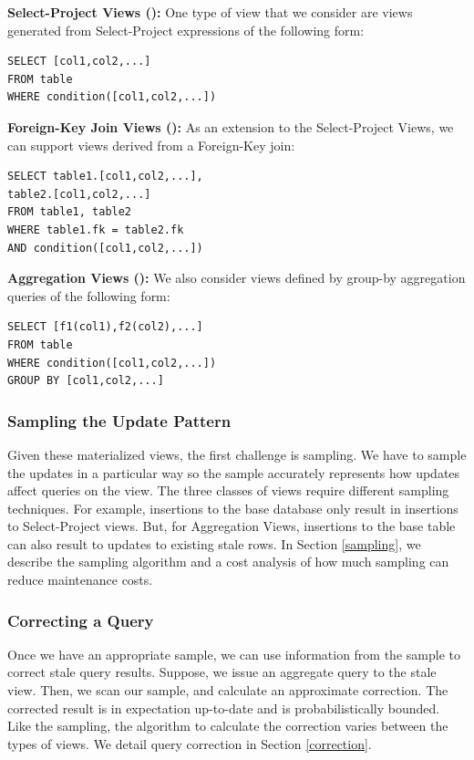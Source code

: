 \noindent\textbf{Select-Project Views (\spview): } One type of view that we consider are views generated from Select-Project
expressions of the following form:

\begin{lstlisting}
SELECT [col1,col2,...] 
FROM table 
WHERE condition([col1,col2,...]) 
\end{lstlisting}

\vspace{1em}

\noindent\textbf{Foreign-Key Join Views (\fjview): } As an extension to the Select-Project Views, we can support views derived from a Foreign-Key join:

\begin{lstlisting}
SELECT table1.[col1,col2,...], 
table2.[col1,col2,...]
FROM table1, table2 
WHERE table1.fk = table2.fk 
AND condition([col1,col2,...]) 
\end{lstlisting}

\vspace{1em}

\noindent\textbf{Aggregation Views (\aggview): } We also consider views defined by group-by aggregation queries of the following form:

\begin{lstlisting}
SELECT [f1(col1),f2(col2),...] 
FROM table 
WHERE condition([col1,col2,...]) 
GROUP BY [col1,col2,...]
\end{lstlisting}

\subsubsection{Sampling the Update Pattern}
Given these materialized views, the first challenge is sampling.
We have to sample the updates in a particular way so the sample accurately represents how updates
affect queries on the view. 
The three classes of views require different sampling techniques.
For example, insertions to the base database only result in insertions to Select-Project views.
But, for Aggregation Views, insertions to the base table can also result to updates to existing stale rows.
In Section \ref{sampling}, we describe the sampling algorithm and a cost analysis of how much sampling can reduce maintenance costs.

\subsubsection{Correcting a Query}
Once we have an appropriate sample, we can use information from the sample to correct stale query results.
Suppose, we issue an aggregate query to the stale view.
Then, we scan our sample, and calculate an approximate correction.
The corrected result is in expectation up-to-date and is probabilistically bounded.
Like the sampling, the algorithm to calculate the correction varies between the types of views.
We detail query correction in Section \ref{correction}.

